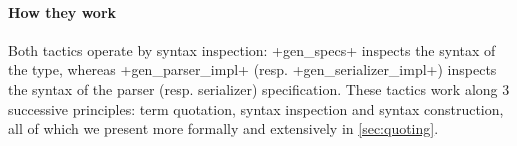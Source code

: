 \documentclass[runningheads]{llncs}
\newcommand\fstar{F$^\star$\xspace}
\newcommand\lowstar{Low$^\star$\xspace}
\newcommand{\comm}[3]{\ifcheckpagebudget\else\ifdraft{{\color{#1}[#2: #3]}}\fi\fi}
\newcommand{\ch}[1]{\comm{teal}{CH}{#1}}
\newcommand{\guido}[1]{\comm{blue}{Guido}{#1}}
\begin{document}



\iffalse
\paragraph{How they work}

Both tactics operate by syntax inspection: \ls+gen_specs+ inspects
the syntax of the type, whereas \ls+gen_parser_impl+
(resp. \ls+gen_serializer_impl+) inspects the syntax of the parser
(resp. serializer) specification.
These tactics work along 3 successive principles: term quotation,
syntax inspection and syntax construction, all of which
we present more formally and extensively in \autoref{sec:quoting}.
\end{document}
